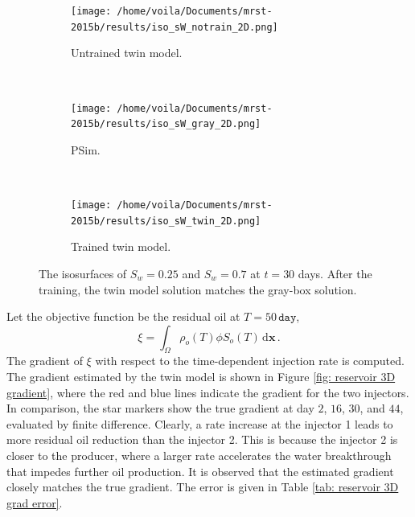 \begin{figure}[htbp]\begin{center}
    \begin{subfigure}[t]{.99\textwidth}
        \centering
        \texttt{[image: /home/voila/Documents/mrst-2015b/results/iso\_sW\_notrain\_2D.png]}
        \label{fig: reservoir 3D untrained}
        \caption{Untrained twin model.}
    \end{subfigure}\\
    \begin{subfigure}[t]{.99\textwidth}
        \centering
        \texttt{[image: /home/voila/Documents/mrst-2015b/results/iso\_sW\_gray\_2D.png]}
        \label{fig: reservoir 3D untrained}
        \caption{PSim.}
    \end{subfigure}\\
    \begin{subfigure}[t]{.99\textwidth}
        \centering
        \texttt{[image: /home/voila/Documents/mrst-2015b/results/iso\_sW\_twin\_2D.png]}
        \label{fig: reservoir 3D untrained}
        \caption{Trained twin model.}
    \end{subfigure}
    \caption{The isosurfaces of $S_w=0.25$ and $S_w=0.7$ at $t=30$ days. After the training,
             the twin model solution matches the gray-box solution.}
    \label{fig: reservoir 3D solutions}
\end{center}\end{figure}

Let the objective function be the residual oil at $T=50 \, \texttt{day}$,
\begin{equation}
    \xi = \int_\Omega \rho_o(T) \phi S_o(T) \,\textrm{d} \boldsymbol{x} \,.
    \label{eqn: chap2 reservoir xi day 50}
\end{equation}
The gradient of $\xi$ with respect to the time-dependent injection rate is computed.
The gradient estimated by the twin model is shown in Figure \ref{fig: reservoir 3D gradient},
where the red and blue lines indicate the gradient for the two injectors. In comparison, 
the star markers show the true gradient at day $2$, $16$, $30$, and $44$, evaluated by finite difference.
Clearly, a rate increase at the injector 1 leads to more residual oil reduction than the injector 2.
This is because the injector 2 is closer to the producer, where a larger rate accelerates the 
water breakthrough that impedes further oil production.
It is observed that the estimated gradient closely matches the true gradient.
The error is given in Table \ref{tab: reservoir 3D grad error}.\\

